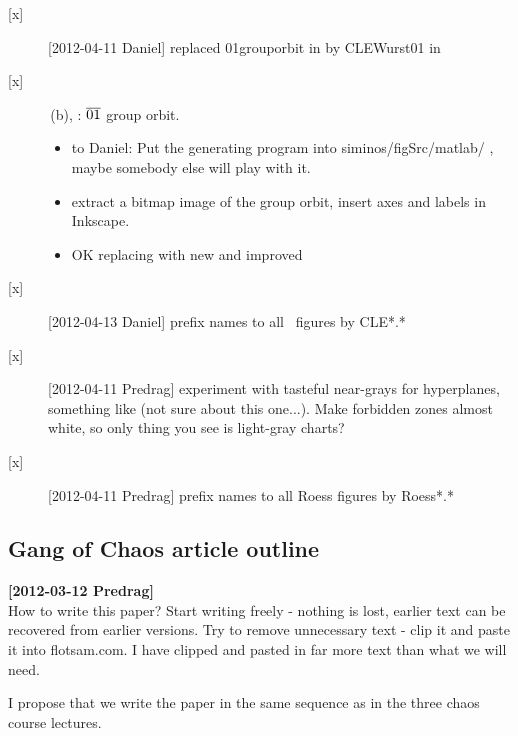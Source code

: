 \begin{description}
\item[{[x]}] [2012-04-11 Daniel]  replaced {01grouporbit} in
    by CLEWurst01 in 

\item[{[x]}] \,(b), \CLf: ${\overline{01}}$ {\rpo} group orbit.
    \begin{itemize}
        \item[{[x]}]  [2012-04-06 Predrag] to Daniel:
            Put the generating program into siminos/figSrc/matlab/ , maybe
            somebody else will play with it.
        \item[{[x]}]  [2012-04-06 Predrag] extract a bitmap image of the
            group orbit, insert axes and labels in Inkscape.
        \item[{[x]}] OK replacing  with new and
            improved 
		\end{itemize}

\item[{[x]}] [2012-04-13 Daniel] prefix names to all \cLe\ figures by CLE*.*
\item[{[x]}] [2012-04-11 Predrag] experiment with tasteful near-grays for hyperplanes,
    something like  (not sure about this one...).
    Make forbidden zones almost white, so only thing you see is light-gray charts?
\item[{[x]}] [2012-04-11 Predrag] prefix names to all Roess figures by Roess*.*

\end{description}
\newpage

\subsection{Gang of Chaos article outline}
\label{chap:outline}

\noindent
{\bf [2012-03-12 Predrag]}
\\
How to write this paper? Start writing freely - nothing is lost, earlier text can be recovered
from earlier versions. Try to remove unnecessary text - clip  it and paste it into flotsam.com.
I have clipped and pasted in far more text than what we will need.

I propose that we write the
paper in the same sequence as in the three chaos course lectures.
\\\\

